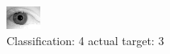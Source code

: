 \begin{figure}[h!]
\begin{center}
\includegraphics[width=0.60\columnwidth]{figures/ID2077_class_4_target_3.png}
\end{center}
\caption{ Classification: 4 actual target: 3}
\label{fig:ID2077_class_4_target_3}
\end{figure}
